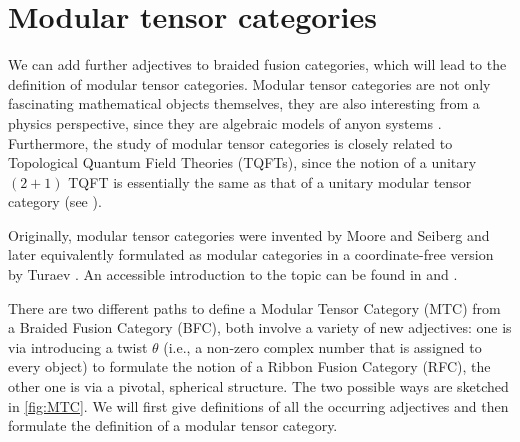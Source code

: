 \section{Modular tensor categories}
\label{sec:MTC}

We can add further adjectives to braided fusion categories, which will lead to the definition of modular tensor categories. Modular tensor categories are not only fascinating mathematical objects themselves, they are also interesting from a physics perspective, since they are algebraic models of anyon systems \cite{kitaev_anyons_2006,Pachos2009,Wang2010,Rowell2018,Barkeshli2019}. Furthermore, the study of modular tensor categories is closely related to Topological Quantum Field Theories (TQFTs), since the notion of a unitary $(2+1)$ TQFT is essentially the same as that of a unitary modular tensor category (see \cite{Turaev2010,Bartlett2015}). 

Originally, modular tensor categories were invented by Moore and Seiberg \cite{Moore1989} and later equivalently formulated as modular categories in a coordinate-free version by Turaev \cite{Turaev1992}. An accessible introduction to the topic can be found in \cite{Turaev2010} and \cite{bakalov_lectures_2001}.

There are two different paths to define a Modular Tensor Category (MTC) from a Braided Fusion Category (BFC), both involve a variety of new adjectives: one is via introducing a twist $\theta$ (i.e., a non-zero complex number that is assigned to every object) to formulate the notion of a Ribbon Fusion Category (RFC), the other one is via a pivotal, spherical structure. The two possible ways are sketched in \cref{fig:MTC}. We will first give definitions of all the occurring adjectives and then formulate the definition of a modular tensor category.

